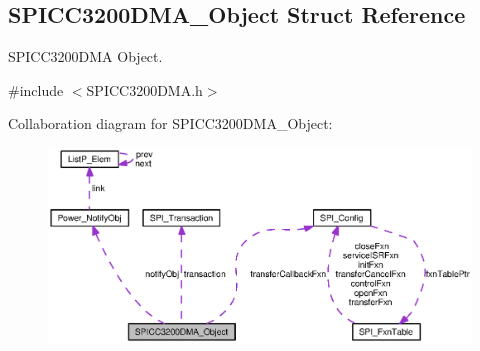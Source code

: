 \subsection{S\+P\+I\+C\+C3200\+D\+M\+A\+\_\+\+Object Struct Reference}
\label{struct_s_p_i_c_c3200_d_m_a___object}


S\+P\+I\+C\+C3200\+D\+M\+A Object.  




{\ttfamily \#include $<$S\+P\+I\+C\+C3200\+D\+M\+A.\+h$>$}



Collaboration diagram for S\+P\+I\+C\+C3200\+D\+M\+A\+\_\+\+Object\+:
\nopagebreak
\begin{figure}[H]
\begin{center}
\leavevmode
\includegraphics[width=350pt]{struct_s_p_i_c_c3200_d_m_a___object__coll__graph}
\end{center}
\end{figure}
